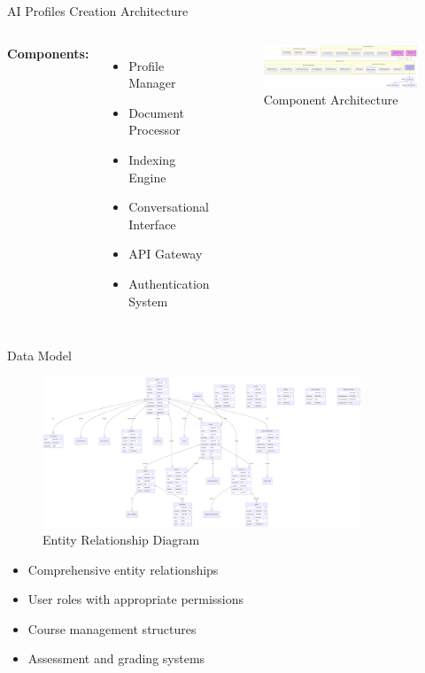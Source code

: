\documentclass[aspectratio=169]{beamer}
\begin{document}
\begin{frame}{AI Profiles Creation Architecture}
    \begin{columns}
        \textbf{Components:}
        \begin{itemize}
            \item Profile Manager
            \item Document Processor
            \item Indexing Engine
            \item Conversational Interface
            \item API Gateway
            \item Authentication System
        \end{itemize}
        \begin{figure}
            \includegraphics[width=\textwidth,height=0.6\textheight,keepaspectratio]{../pfe-pics/diagrames/Component Diagram (showing the system_s architecture).png}
            \caption{Component Architecture}
        \end{figure}
    \end{columns}
\end{frame}

\begin{frame}{Data Model}
    \begin{figure}
        \includegraphics[width=0.85\textwidth,height=0.7\textheight,keepaspectratio]{../pfe-pics/diagrames/tabaales.png}
        \caption{Entity Relationship Diagram}
    \end{figure}
    \begin{itemize}
        \item Comprehensive entity relationships
        \item User roles with appropriate permissions
        \item Course management structures
        \item Assessment and grading systems
    \end{itemize}
\end{frame}
\end{document}
